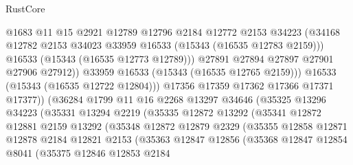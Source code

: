 \begin{lexlean}{RustCore}
\begin{coremodule}
                            @1683
                            @11
                            @15
                            @2921
                            @12789
                            @12796
                            @2184
                            @12772
                            @2153
                            @34223
                            (@34168
                              @12782
                              @2153
                              @34023
                              @33959
                              @16533
                              (@15343 (@16535 @12783 @2159)))
                            @16533
                            (@15343 (@16535 @12773 @12789)))
                          @27891
                          @27894
                          @27897
                          @27901
                          @27906
                          @27912))
                      @33959
                      @16533
                      (@15343 (@16535 @12765 @2159)))
                    @16533
                    (@15343 (@16535 @12722 @12804)))
                  @17356
                  @17359
                  @17362
                  @17366
                  @17371
                  @17377))
              (@36284
                @1799
                @11
                @16
                @2268
                @13297
                @34646
                (@35325
                  @13296
                  @34223
                  (@35331
                    @13294
                    @2219
                    (@35335
                      @12872
                      @13292
                      (@35341
                        @12872
                        @12881
                        @2159
                        @13292
                        (@35348
                          @12872
                          @12879
                          @2329
                          (@35355
                            @12858
                            @12871
                            @12878
                            @2184
                            @12821
                            @2153
                            (@35363
                              @12847
                              @12856
                              (@35368
                                @12847
                                @12854
                                @8041
                                (@35375
                                  @12846
                                  @12853
                                  @2184

\end{coremodule}
\end{lexlean}
